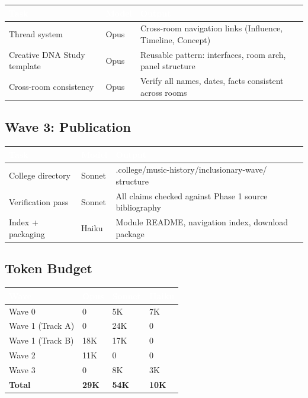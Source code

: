 \documentclass[11pt,letterpaper]{article}
\newcommand{\tableheader}[1]{\textbf{\sffamily\textcolor{white}{#1}}}
\begin{document}
\begin{center}
\begin{tabularx}{\textwidth}{L{4cm}C{1.5cm}X}
\toprule
{}
\tableheader{Task} & \tableheader{Model} & \tableheader{Output} \\
\midrule
Thread system & Opus & Cross-room navigation links (Influence, Timeline, Concept) \\
Creative DNA Study template & Opus & Reusable pattern: interfaces, room arch, panel structure \\
Cross-room consistency & Opus & Verify all names, dates, facts consistent across rooms \\
\bottomrule
\end{tabularx}
\end{center}

\subsection{Wave 3: Publication}

\begin{center}
\begin{tabularx}{\textwidth}{L{4cm}C{1.5cm}X}
\toprule
{}
\tableheader{Task} & \tableheader{Model} & \tableheader{Output} \\
\midrule
College directory & Sonnet & .college/music-history/inclusionary-wave/ structure \\
Verification pass & Sonnet & All claims checked against Phase 1 source bibliography \\
Index + packaging & Haiku & Module README, navigation index, download package \\
\bottomrule
\end{tabularx}
\end{center}

\subsection{Token Budget}

\begin{center}
\begin{tabularx}{\textwidth}{L{4cm}C{2cm}C{2cm}C{2cm}}
\toprule
{}
\tableheader{Wave} & \tableheader{Opus} & \tableheader{Sonnet} & \tableheader{Haiku} \\
\midrule
Wave 0 & 0 & 5K & 7K \\
Wave 1 (Track A) & 0 & 24K & 0 \\
Wave 1 (Track B) & 18K & 17K & 0 \\
Wave 2 & 11K & 0 & 0 \\
Wave 3 & 0 & 8K & 3K \\
\midrule
\textbf{Total} & \textbf{29K} & \textbf{54K} & \textbf{10K} \\
\bottomrule
\end{tabularx}
\end{center}
\end{document}
